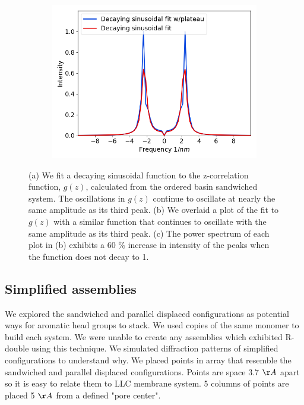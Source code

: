 \documentclass[journal=jpcbfk,manusciprt=article]{achemso}
\begin{document}
\begin{figure}[!htb]
\begin{subfigure}{0.32\textwidth}
  \includegraphics[width=\textwidth]{power_spectrum_comparison.png}
  \caption{}\label{fig:power_spectrum_comparison}
  \end{subfigure}
  \caption{(a) We fit a decaying sinusoidal function to the z-correlation function, $g(z)$, 
  calculated from the ordered basin sandwiched system. The oscillations in $g(z)$ continue
  to oscillate at nearly the same amplitude as its third peak. (b) We overlaid a plot of the
  fit to $g(z)$ with a similar function that continues to oscillate with the same amplitude
  as its third peak. (c) The power spectrum of each plot in (b) exhibits a 60 \% increase in
  intensity of the peaks when the function does not decay to 1.}\label{fig:rpi_ft}
  \end{figure}
  
  \subsection{Simplified assemblies}\label{section:simplified_assemblies}
  
  We explored the sandwiched and parallel displaced configurations as potential ways for
  aromatic head groups to stack. We used copies of the same monomer to build each system.
  We were unable to create any assemblies which exhibited R-double using this technique. 
  We simulated diffraction patterns of simplified configurations to understand why. We 
  placed points in array that resemble the sandwiched and parallel displaced configurations.
  Points are space 3.7 $\AA$ apart so it is easy to relate them to LLC membrane system.
  5 columns of points are placed 5 $\AA$ from a defined "pore center".
  
\end{document}
